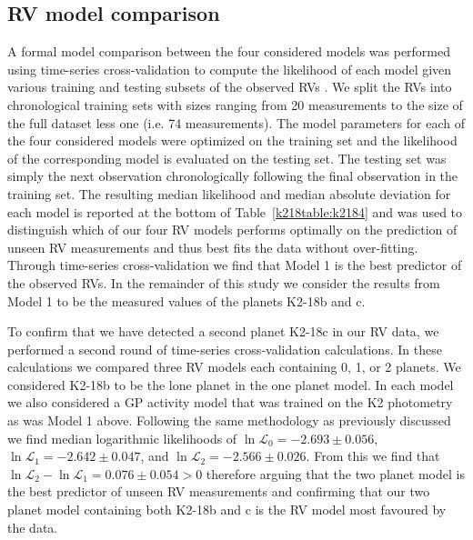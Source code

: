 \subsection{RV model comparison} \label{k218sect:modelcomp}
A formal model comparison between the four considered models was performed using
time-series cross-validation
to compute the likelihood of each model given various training and testing subsets of the 
observed RVs \citep{arlot10}.
We split the RVs into chronological training sets with sizes ranging from 20 measurements to the
size of the full dataset less one (i.e. 74 measurements). The model parameters for each of the
four considered models were optimized on the training
set and the likelihood of the corresponding model is evaluated on the testing set. The testing set was simply
the next observation chronologically following the final observation in the training set. The resulting median likelihood
and median absolute deviation for each model is
reported at the bottom of Table~\ref{k218table:k2184} and was used to distinguish which of our four
RV models performs optimally on the prediction of unseen RV measurements and thus best fits the data without over-fitting.
Through time-series cross-validation we find that Model 1 is the best predictor of the observed RVs. In the remainder of
this study we consider the results from Model 1 to be the measured values of the planets K2-18b and c.

To confirm that we have detected a second planet K2-18c in our RV data, we performed a second round of time-series
cross-validation calculations. In these calculations we compared
three RV models each containing 0, 1, or 2 planets. We considered K2-18b to be the
lone planet in the one planet model. In each model we also considered
a GP activity model that was trained on the K2 photometry as was Model 1 above.
Following the same methodology as previously
discussed we find median logarithmic likelihoods of $\ln{\mathcal{L}_0}=-2.693 \pm 0.056$,
$\ln{\mathcal{L}_1}=-2.642 \pm 0.047$, and $\ln{\mathcal{L}_2}=-2.566 \pm 0.026$.
From this we find that $\ln{\mathcal{L}_2}-\ln{\mathcal{L}_1} = 0.076 \pm 0.054 > 0$ therefore arguing that
the two planet model is the best predictor of unseen RV measurements and confirming that our two planet model
containing both K2-18b and c is the RV model most favoured by the data. 

